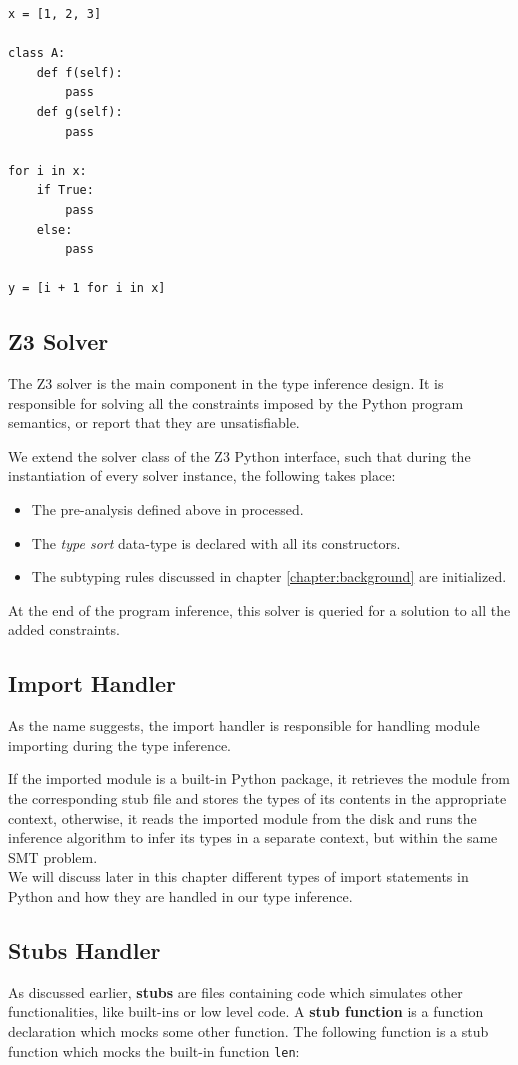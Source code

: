 \begin{lstlisting}
x = [1, 2, 3]

class A:
	def f(self):
		pass
	def g(self):
		pass
	
for i in x:
	if True:
		pass
	else:
		pass
		
y = [i + 1 for i in x]
\end{lstlisting}
\subsection{Z3 Solver}
The Z3 solver is the main component in the type inference design. It is responsible for solving all the constraints imposed by the Python program semantics, or report that they are unsatisfiable.

We extend the solver class of the Z3 Python interface, such that during the instantiation of every solver instance, the following takes place:

\begin{itemize}
	\item The pre-analysis defined above in processed.
	\item The \textit{type sort} data-type is declared with all its constructors.
	\item The subtyping rules discussed in chapter \ref{chapter:background} are initialized. 
\end{itemize}

At the end of the program inference, this solver is queried for a solution to all the added constraints.

\subsection{Import Handler}
As the name suggests, the import handler is responsible for handling module importing during the type inference.

If the imported module is a built-in Python package, it retrieves the module from the corresponding stub file and stores the types of its contents in the appropriate context, otherwise, it reads the imported module from the disk and runs the inference algorithm to infer its types in a separate context, but within the same SMT problem.\\

We will discuss later in this chapter different types of import statements in Python and how they are handled in our type inference.
\subsection{Stubs Handler}
As discussed earlier, \textbf{stubs} are files containing code which simulates other functionalities, like built-ins or low level code. A \textbf{stub function} is a function declaration which mocks some other function. The following function is a stub function which mocks the built-in function \lstinline|len|:

